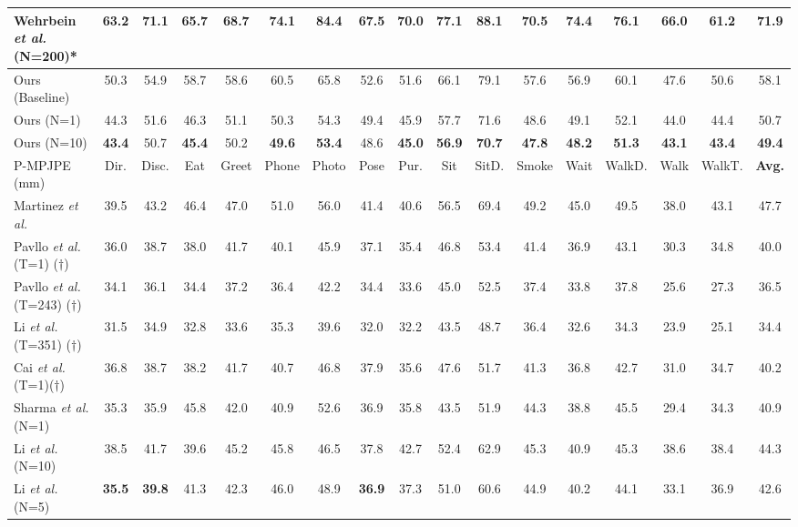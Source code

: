 \documentclass[letterpaper, 10 pt, conference]{ieeeconf}
\begin{document}
\begin{table*}[t]
{\begin{tabular}{l|ccccccccccccccc|c}
        Wehrbein \textit{et al.} \cite{wehrbein2021probabilistic} (N=200)* & 63.2 & 71.1 & 65.7 & 68.7 & 74.1 & 84.4 & 67.5 & 70.0 & 77.1 & 88.1 & 70.5 & 74.4 & 76.1 & 66.0 & 61.2 & 71.9 \\
        \hline
        Ours (Baseline) & 50.3 & 54.9 & 58.7 & 58.6 & 60.5 & 65.8 &52.6  &51.6  &66.1  &79.1  & 57.6 & 56.9 & 60.1 & 47.6 & 50.6 & 58.1 \\
        Ours (N=1) & 44.3 & 51.6 & 46.3 & 51.1 & 50.3 & 54.3 &49.4 & 45.9 & 57.7 & 71.6 & 48.6 & 49.1 & 52.1 & 44.0 & 44.4 & 50.7\\
        Ours (N=10) & \textbf{43.4} & 50.7 & \textbf{45.4} & 50.2 & \textbf{49.6} & \textbf{53.4} & 48.6 & \textbf{45.0} & \textbf{56.9} & \textbf{70.7} & \textbf{47.8} & \textbf{48.2}  & \textbf{51.3} & \textbf{43.1}  & \textbf{43.4} & \textbf{49.4} \\
        \midrule\midrule
        P-MPJPE (mm) & Dir. & Disc. & Eat & Greet & Phone & Photo & Pose & Pur. & Sit & SitD. & Smoke & Wait & WalkD. & Walk & WalkT. & \textbf{Avg.} \\
        \hline
        Martinez \textit{et al.} \cite{martinez2017simple} & 39.5& 43.2& 46.4& 47.0& 51.0& 56.0& 41.4& 40.6& 56.5& 69.4& 49.2& 45.0& 49.5& 38.0& 43.1 &47.7\\
        Pavllo \textit{et al.} \cite{pavllo20193d} (T=1) ($\dagger$)  &36.0 &38.7& 38.0& 41.7& 40.1& 45.9& 37.1& 35.4& 46.8& 53.4& 41.4& 36.9& 43.1& 30.3& 34.8& 40.0\\
        Pavllo \textit{et al.} \cite{pavllo20193d} (T=243) ($\dagger$) &34.1 &36.1& 34.4 &37.2& 36.4& 42.2& 34.4& 33.6 &45.0& 52.5& 37.4& 33.8& 37.8& 25.6& 27.3& 36.5\\
        Li \textit{et al.} \cite{li2022mhformer} (T=351) ($\dagger$) &31.5& 34.9& 32.8 &33.6& 35.3& 39.6& 32.0 &32.2 &43.5& 48.7& 36.4& 32.6& 34.3& 23.9 &25.1 &34.4\\
        Cai \textit{et al.} \cite{cai2019exploiting} (T=1)($\dagger$)  &36.8& 38.7& 38.2& 41.7& 40.7& 46.8& 37.9& 35.6& 47.6 &51.7& 41.3& 36.8 &42.7& 31.0 &34.7 &40.2
        \\\hline
        Sharma \textit{et al.} \cite{sharma2019monocular} (N=1)  & 35.3& 35.9& 45.8& 42.0& 40.9& 52.6& 36.9& 35.8& 43.5& 51.9& 44.3& 38.8& 45.5& 29.4& 34.3& 40.9  \\
        Li \textit{et al.} \cite{li2020weakly} (N=10)  &38.5& 41.7& 39.6& 45.2& 45.8& 46.5& 37.8& 42.7& 52.4& 62.9& 45.3& 40.9& 45.3& 38.6& 38.4& 44.3 \\        
        Li \textit{et al.} \cite{li2019generating} (N=5)  & \textbf{35.5}& \textbf{39.8}& 41.3 &42.3& 46.0& 48.9& \textbf{36.9}& 37.3& 51.0& 60.6& 44.9& 40.2& 44.1& 33.1& 36.9& 42.6 \\

\end{tabular}}
\end{table*}
\end{document}
